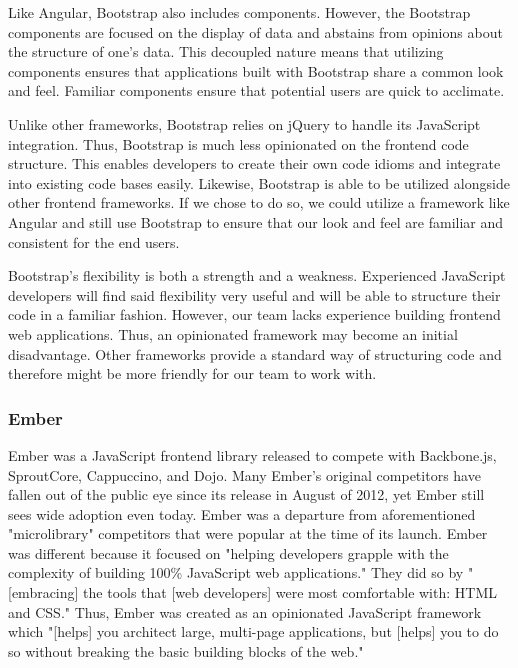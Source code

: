 \documentclass[12pt]{report}
\begin{document}
Like Angular, Bootstrap also includes components. However, the Bootstrap components are focused on the display of data and abstains from opinions about the structure of one's data. This decoupled nature means that utilizing components ensures that applications built with Bootstrap share a common look and feel. Familiar components ensure that potential users are quick to acclimate.

Unlike other frameworks, Bootstrap relies on jQuery to handle its JavaScript integration.\cite{bootstrapjs} Thus, Bootstrap is much less opinionated on the frontend code structure. This enables developers to create their own code idioms and integrate into existing code bases easily. Likewise, Bootstrap is able to be utilized alongside other frontend frameworks. If we chose to do so, we could utilize a framework like Angular and still use Bootstrap to ensure that our look and feel are familiar and consistent for the end users.

Bootstrap's flexibility is both a strength and a weakness. Experienced JavaScript developers will find said flexibility very useful and will be able to structure their code in a familiar fashion. However, our team lacks experience building frontend web applications. Thus, an opinionated framework may become an initial disadvantage. Other frameworks provide a standard way of structuring code and therefore might be more friendly for our team to work with.

\subsubsection*{Ember}

Ember was a JavaScript frontend library released to compete with Backbone.js, SproutCore, Cappuccino, and Dojo.\cite{emberrelease} Many Ember's original competitors have fallen out of the public eye since its release in August of 2012, yet Ember still sees wide adoption even today. Ember was a departure from aforementioned "microlibrary" competitors that were popular at the time of its launch. Ember was different because it focused on "helping developers grapple with the complexity of building 100\% JavaScript web applications."\cite{emberrelease} They did so by "[embracing] the tools that [web developers] were most comfortable with: HTML and CSS."\cite{emberrelease} Thus, Ember was created as an opinionated JavaScript framework which "[helps] you architect large, multi-page applications, but [helps] you to do so without breaking the basic building blocks of the web."\cite{emberrelease}
\end{document}
